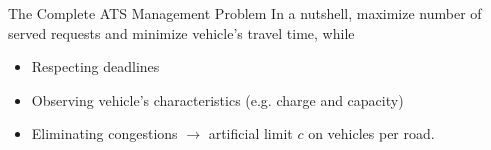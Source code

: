 
\begin{frame}{The Complete ATS Management Problem}
	In a nutshell, maximize number of served requests and minimize vehicle's travel time, while
	\begin{itemize}
		\item Respecting deadlines
		\item Observing vehicle's characteristics (e.g. charge and capacity)
		\item  Eliminating congestions $\rightarrow$ artificial limit $c$ on vehicles per road.
	\end{itemize}
\end{frame}

